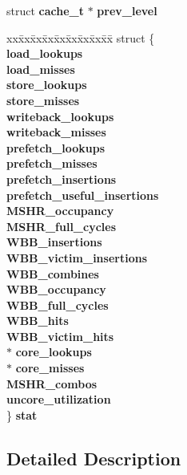 \begin{CompactItemize}
\begin{tabbing}
\end{tabbing}\item 
struct {\bf cache\_\-t} $\ast$ {\bf prev\_\-level}
\item 
\begin{tabbing}
xx\=xx\=xx\=xx\=xx\=xx\=xx\=xx\=xx\=\kill
struct \{\\
 {\bf load\_lookups}\\
 {\bf load\_misses}\\
 {\bf store\_lookups}\\
 {\bf store\_misses}\\
 {\bf writeback\_lookups}\\
 {\bf writeback\_misses}\\
 {\bf prefetch\_lookups}\\
 {\bf prefetch\_misses}\\
 {\bf prefetch\_insertions}\\
 {\bf prefetch\_useful\_insertions}\\
 {\bf MSHR\_occupancy}\\
 {\bf MSHR\_full\_cycles}\\
 {\bf WBB\_insertions}\\
 {\bf WBB\_victim\_insertions}\\
 {\bf WBB\_combines}\\
 {\bf WBB\_occupancy}\\
 {\bf WBB\_full\_cycles}\\
 {\bf WBB\_hits}\\
 {\bf WBB\_victim\_hits}\\
 $\ast$ {\bf core\_lookups}\\
 $\ast$ {\bf core\_misses}\\
 {\bf MSHR\_combos}\\
 {\bf uncore\_utilization}\\
\} {\bf stat}\\

\end{tabbing}\end{CompactItemize}


\subsection{Detailed Description}


